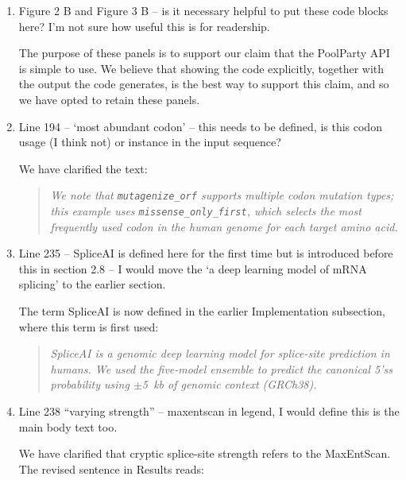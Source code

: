 \documentclass[11pt]{article}
\newenvironment{response}{\par\color{responseblue}}{\par}
\newenvironment{msquote}
  {\begin{quote}\color{responseblue}\itshape\noindent\ignorespaces}
  {\end{quote}}
\begin{document}
\begin{enumerate}
\item Figure 2 B and Figure 3 B -- is it necessary helpful to put these code
blocks here? I'm not sure how useful this is for readership.

\begin{response}
The purpose of these panels is to support our claim that the PoolParty API is simple to use. We believe that showing the code explicitly, together with the output the code generates, is the best way to support this claim, and so we have opted to retain these panels. 
\end{response}

\item Line 194 -- `most abundant codon' -- this needs to be defined, is this
codon usage (I think not) or instance in the input sequence?

\begin{response}
We have clarified the text:
\end{response}

\begin{msquote}
We note that \texttt{mutagenize\_orf} supports multiple codon mutation types; this example uses \texttt{missense\_only\_first}, which selects the most frequently used codon in the human genome for each target amino acid.
\end{msquote}

\item Line 235 -- SpliceAI is defined here for the first time but is introduced
before this in section 2.8 -- I would move the `a deep learning model of mRNA
splicing' to the earlier section.

\begin{response}
The term SpliceAI is now defined in the earlier Implementation subsection, where this term is first used:
\end{response}

\begin{msquote}
SpliceAI \citep{Jaganathan2019ps} is a genomic deep learning model for splice-site prediction in humans. We used the five-model ensemble to predict the canonical 5'ss probability using $\pm$5~kb of genomic context (GRCh38).
\end{msquote}

\item Line 238 ``varying strength'' -- maxentscan in legend, I would define this
is the main body text too.

\begin{response}
We have clarified that cryptic splice-site strength refers to the MaxEntScan. The revised sentence in Results reads:
\end{response}


\end{enumerate}
\end{document}
